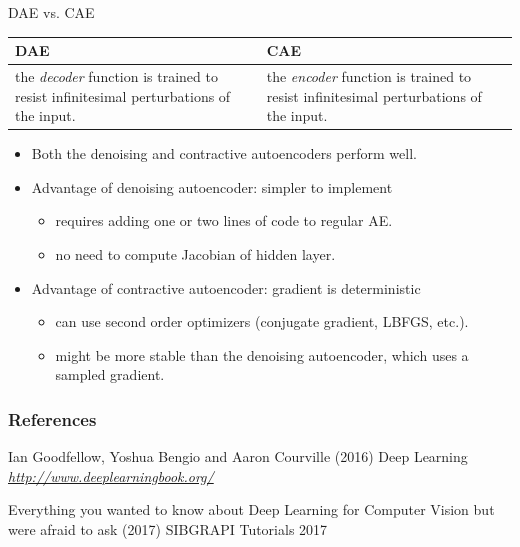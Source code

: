 \begin{frame}[t]{DAE vs. CAE}
    \begin{table}[h!]
        \centering
        \label{tab:}
        \begin{tabular}{p{5cm}|p{5cm}}
            \textbf{DAE} & \textbf{CAE}\\
            \hline
            the \textit{decoder} function is trained to resist infinitesimal perturbations of the input. & the \textit{encoder} function is trained to resist infinitesimal perturbations of the input.
        \end{tabular}
    \end{table}

\begin{itemize}
\item Both the denoising and contractive autoencoders perform well.
\item Advantage of denoising autoencoder: simpler to implement
\begin{itemize}
\item  requires adding one or two lines of code to regular AE.
\item  no need to compute Jacobian of hidden layer.
\end{itemize}
\item Advantage of contractive autoencoder: gradient is deterministic
\begin{itemize}
\item can use second order optimizers (conjugate gradient, LBFGS, etc.).
\item might be more stable than the denoising autoencoder, which uses a sampled gradient.
\end{itemize}

\end{itemize}

\end{frame}

\begin{vbframe}
\frametitle{References}
\footnotesize{
\begin{thebibliography}{99}
 Ian Goodfellow, Yoshua Bengio and Aaron Courville (2016)
\newblock Deep Learning
\newblock \emph{\url{http://www.deeplearningbook.org/}}

 Everything you wanted to know about Deep Learning for Computer Vision but were afraid to ask (2017)
\newblock SIBGRAPI Tutorials 2017

\end{thebibliography}
}
\end{vbframe}


\endlecture

